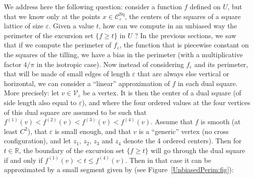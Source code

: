 \documentclass[AHL,Unicode,longabstracts,published]{cedram}
\newcommand{\R}{\mathbb{R}}
\newcommand{\eps}{\varepsilon}
\DeclareMathOperator{\Sq}{Sq}
\newcommand{\calC}{\mathcal{C}}
\newcommand{\calV}{\mathcal{V}}
\begin{document}
We address here the following question: consider a function $f$ defined on $U$, but that we know only at the points $x\in\calC_\eps^{\Sq}$, the centers of the squares of a square lattice of size $\eps$. Given a value $t$, how can we compute in an unbiased way the perimeter of the excursion set $\{ f\ge t\}$ in $U$ ? In the previous sections, we saw that if we compute the perimeter of $f_\eps$, the function that is piecewise constant on the squares of the tilling, we have a bias in the perimeter (with a multiplicative factor $4/\pi$ in the isotropic case). Now instead of considering $f_\eps$ and its perimeter, that will be made of small edges of length $\eps$ that are always else vertical or horizontal, we can consider a ``linear'' approximation of $f$ in each dual square. More precisely: let $v\in\calV_\eps$ be a vertex. It is then the center of a dual square (of side length also equal to $\eps$), and where the four ordered values at the four vertices of this dual square are assumed to be such that $f^{(1)}(v)< f^{(2)}(v)< f^{(3)}(v)< f^{(4)}(v)$. Assume that $f$ is smooth (at least $C^2$), that $\eps$ is small enough, and that $v$ is a ``generic'' vertex (no cross configuration), and let $z_1$, $z_2$, $z_3$ and $z_4$ denote the 4 ordered centers). Then for $t\in\R$, the boundary of the excursion set $\{ f\ge t\}$ will go through the dual square if and only if $f^{(1)}(v)< t\leq f^{(4)}(v)$. Then in that case it can be approximated by a small segment given by (see Figure~\ref{UnbiasedPerim:fig}):
\end{document}
